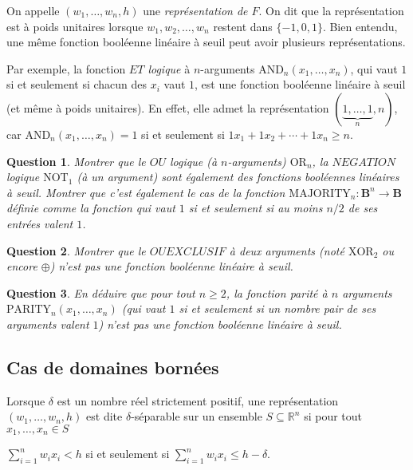 \documentclass[10pt]{article}
\newtheorem{question}{Question}
\begin{document}
On appelle $\left(w_{1}, \ldots, w_{n}, h\right)$ une \emph{représentation de $F$}. On dit que la représentation est à poids unitaires lorsque $w_{1}, w_{2}, \ldots, w_{n}$ restent dans $\{-1,0,1\}$. Bien entendu, une même fonction booléenne linéaire à seuil peut avoir plusieurs représentations.

Par exemple, la fonction \emph{$ET$ logique} à $n$-arguments $\mathrm{AND}_{n}\left(x_{1}, \ldots, x_{n}\right)$, qui vaut $1$ si et seulement si chacun des $x_{i}$ vaut $1$, est une fonction booléenne linéaire à seuil (et même à poids unitaires). En effet, elle admet la représentation $(\underbrace{1, \ldots, 1}_{n}, n)$, car $\mathrm{AND}_{n}\left(x_{1}, \ldots, x_{n}\right)=1$ si et seulement si $1 x_{1}+1 x_{2}+\cdots+1 x_{n} ≥ n$.

\begin{question}
	Montrer que le \emph{$OU$ logique} (à $n$-arguments) $\mathrm{OR}_{n}$, la \emph{$NEGATION$ logique} $\mathrm{NOT}_{1}$ (à un argument) sont également des fonctions booléennes linéaires à seuil. Montrer que c'est également le cas de la fonction $\mathrm{MAJORITY}_{n}: \mathbf{B}^{n} → \mathbf{B}$ définie comme la fonction qui vaut $1$ si et seulement si au moins $n / 2$ de ses entrées valent $1$.
\end{question}

\begin{question}
	Montrer que le $OU EXCLUSIF$ à deux arguments (noté $\mathrm{XOR}_{2}$ ou encore $\oplus$) n'est pas une fonction booléenne linéaire à seuil.
\end{question}

\begin{question}
	En déduire que pour tout $n ≥ 2$, la fonction parité à $n$ arguments $\mathrm{PARITY}_{n}\left(x_{1}, \ldots, x_{n}\right)$ (qui vaut $1$ si et seulement si un nombre pair de ses arguments valent $1$) n'est pas une fonction booléenne linéaire à seuil.
\end{question}

\subsection{Cas de domaines bornées}

Lorsque $δ$ est un nombre réel strictement positif, une représentation $\left(w_{1}, \ldots, w_{n}, h\right)$ est dite $δ$-séparable sur un ensemble $S \subseteq ℝ^{n}$ si pour tout $x_{1}, \ldots, x_{n} ∈ S$
\begin{center}
$\sum\limits_{i=1}^{n} w_{i} x_{i}<h$ si et seulement si $\sum\limits_{i=1}^{n} w_{i} x_{i} ≤ h-δ$.
\end{center}
\end{document}
